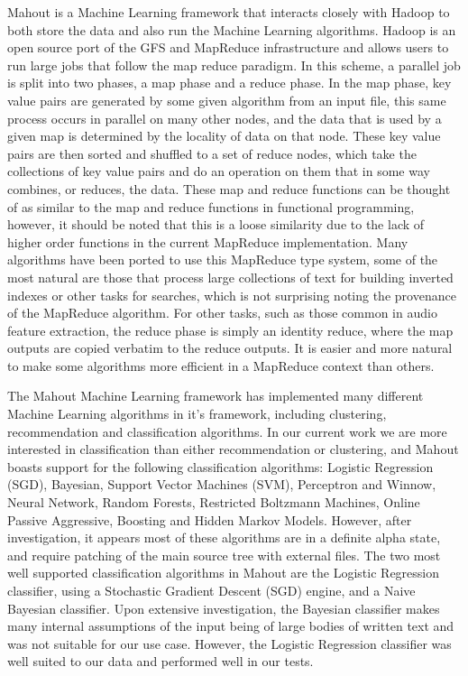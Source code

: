 \documentclass[12pt,oneside]{book}
\begin{document}
Mahout is a Machine Learning framework that interacts closely with
Hadoop to both store the data and also run the Machine Learning
algorithms.  Hadoop is an open source port of the GFS
\cite{ghemawat03} and MapReduce \cite{dean08} infrastructure and
allows users to run large jobs that follow the map reduce paradigm.
In this scheme, a parallel job is split into two phases, a map phase
and a reduce phase.  In the map phase, key value pairs are generated
by some given algorithm from an input file, this same process occurs
in parallel on many other nodes, and the data that is used by a given
map is determined by the locality of data on that node.  These key
value pairs are then sorted and shuffled to a set of reduce nodes,
which take the collections of key value pairs and do an operation on
them that in some way combines, or reduces, the data.  These map and
reduce functions can be thought of as similar to the map and reduce
functions in functional programming, however, it should be noted that
this is a loose similarity due to the lack of higher order functions
in the current MapReduce implementation.  Many algorithms have been
ported to use this MapReduce type system, some of the most natural are
those that process large collections of text for building inverted
indexes or other tasks for searches, which is not surprising noting
the provenance of the MapReduce algorithm.  For other tasks, such as
those common in audio feature extraction, the reduce phase is simply
an identity reduce, where the map outputs are copied verbatim to the
reduce outputs.  It is easier and more natural to make some algorithms
more efficient in a MapReduce context than others.

The Mahout Machine Learning framework has implemented many different
Machine Learning algorithms in it's framework, including clustering,
recommendation and classification algorithms.  In our current work we
are more interested in classification than either recommendation or
clustering, and Mahout boasts support for the following classification
algorithms: Logistic Regression (SGD), Bayesian, Support Vector
Machines (SVM), Perceptron and Winnow, Neural Network, Random Forests,
Restricted Boltzmann Machines, Online Passive Aggressive, Boosting and
Hidden Markov Models.  However, after investigation, it appears most
of these algorithms are in a definite alpha state, and require
patching of the main source tree with external files.  The two most
well supported classification algorithms in Mahout are the Logistic
Regression classifier, using a Stochastic Gradient Descent (SGD)
engine, and a Naive Bayesian classifier.  Upon extensive
investigation, the Bayesian classifier makes many internal assumptions
of the input being of large bodies of written text and was not
suitable for our use case.  However, the Logistic Regression
classifier was well suited to our data and performed well in our
tests.
\end{document}
